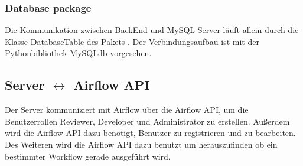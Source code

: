 \subsubsection{Database package}
Die Kommunikation zwischen BackEnd und MySQL-Server läuft allein durch die Klasse DatabaseTable des Pakets . 
Der Verbindungsaufbau ist mit der Pythonbibliothek MySQLdb vorgesehen.


\subsection{Server $\leftrightarrow$ Airflow API}
Der Server kommuniziert mit Airflow über die Airflow API, um die Benutzerrollen Reviewer, Developer und Administrator zu erstellen.
Außerdem wird die Airflow API dazu benötigt, Benutzer zu registrieren und zu bearbeiten.
Des Weiteren wird die Airflow API dazu benutzt um herauszufinden ob ein bestimmter Workflow gerade ausgeführt wird.

\newpage